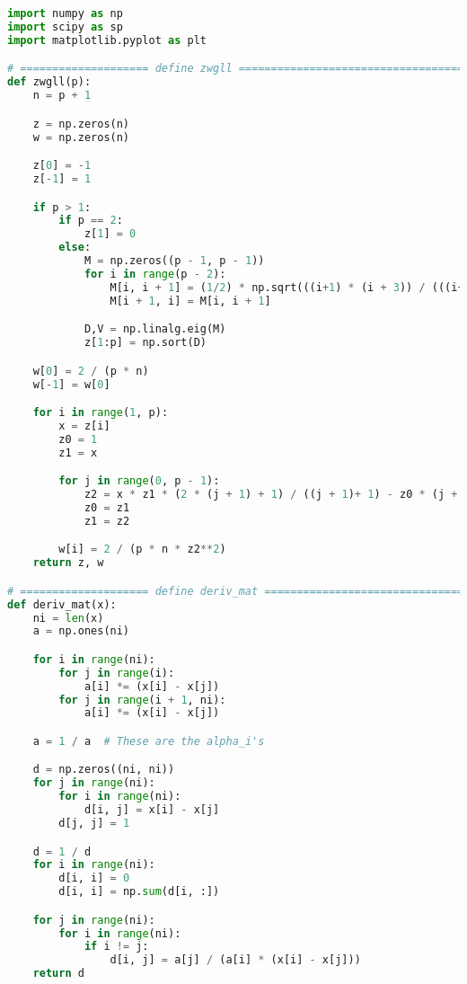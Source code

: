 \documentclass[11pt,letterpaper]{article}
\begin{document}
\newpage
\section*{}
\begin{lstlisting}[language=Python, caption=Question 2 Python code]
import numpy as np
import scipy as sp
import matplotlib.pyplot as plt

# ==================== define zwgll ===================================
def zwgll(p):
    n = p + 1

    z = np.zeros(n)
    w = np.zeros(n)

    z[0] = -1
    z[-1] = 1

    if p > 1:
        if p == 2:
            z[1] = 0
        else:
            M = np.zeros((p - 1, p - 1))
            for i in range(p - 2):
                M[i, i + 1] = (1/2) * np.sqrt(((i+1) * (i + 3)) / (((i+1) + 1/2) * ((i+1)+ 3/2)))
                M[i + 1, i] = M[i, i + 1]

            D,V = np.linalg.eig(M)
            z[1:p] = np.sort(D)

    w[0] = 2 / (p * n)
    w[-1] = w[0]

    for i in range(1, p):
        x = z[i]
        z0 = 1
        z1 = x

        for j in range(0, p - 1):
            z2 = x * z1 * (2 * (j + 1) + 1) / ((j + 1)+ 1) - z0 * (j + 1) / ((j + 1) + 1)
            z0 = z1
            z1 = z2

        w[i] = 2 / (p * n * z2**2)
    return z, w

# ==================== define deriv_mat ===============================
def deriv_mat(x):
    ni = len(x)
    a = np.ones(ni)

    for i in range(ni):
        for j in range(i):
            a[i] *= (x[i] - x[j])
        for j in range(i + 1, ni):
            a[i] *= (x[i] - x[j])

    a = 1 / a  # These are the alpha_i's

    d = np.zeros((ni, ni))
    for j in range(ni):
        for i in range(ni):
            d[i, j] = x[i] - x[j]
        d[j, j] = 1

    d = 1 / d
    for i in range(ni):
        d[i, i] = 0
        d[i, i] = np.sum(d[i, :])

    for j in range(ni):
        for i in range(ni):
            if i != j:
                d[i, j] = a[j] / (a[i] * (x[i] - x[j]))
    return d


\end{lstlisting}
\end{document}
